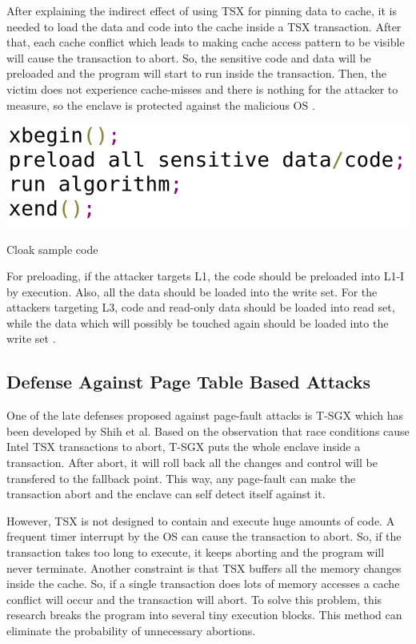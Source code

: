 After explaining the indirect effect of using TSX for pinning data to cache, it is needed to load the data and code into the cache inside a TSX transaction. After that, each cache conflict which leads to making cache access pattern to be visible will cause the transaction to abort. So, the sensitive code and data will be preloaded and the program will start to run inside the transaction. Then, the victim does not experience cache-misses and there is nothing for the attacker to measure, so the enclave is protected against the malicious OS \cite{cloak}.

\begin{algorithm}[t]
	\includegraphics[scale=0.25]{images/cloakcode}
	\caption{Cloak sample code \cite{cloak}}
	\label{alg:cloak}
\end{algorithm}

For preloading, if the attacker targets L1, the code should be preloaded into L1-I by execution. Also, all the data should be loaded into the write set. For the attackers targeting L3, code and read-only data should be loaded into read set, while the data which will possibly be touched again should be loaded into the write set \cite{cloak}.

\subsection{Defense Against Page Table Based Attacks}
One of the late defenses proposed against page-fault attacks is T-SGX \cite{tsgx} which has been developed by Shih et al. Based on the observation that race conditions cause Intel TSX transactions to abort, T-SGX puts the whole enclave inside a transaction. After abort, it will roll back all the changes and control will be transfered to the fallback point. This way, any page-fault can make the transaction abort and the enclave can self detect itself against it.

However, TSX is not designed to contain and execute huge amounts of code. A frequent timer interrupt by the OS can cause the transaction to abort. So, if the transaction takes too long to execute, it keeps aborting and the program will never terminate. Another constraint is that TSX buffers all the memory changes inside the cache. So, if a single transaction does lots of memory accesses a cache conflict will occur and the transaction will abort. To solve this problem, this research breaks the program into several tiny execution blocks. This method can eliminate the probability of unnecessary abortions.

